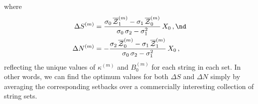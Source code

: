 where
\begin{subequations}%
  \begin{align}
    \Delta S^{(m)} &= \frac{\sigma_0\, \overline{\mathcal{Z}}^{(m)}_1 - \sigma_1\, \overline{\mathcal{Z}}^{(m)}_0}{\sigma_0\, \sigma_2 - \sigma_1^2}\, X_0\, , \nd \\
    \Delta N^{(m)} &= -\frac{\sigma_2\, \overline{\mathcal{Z}}^{(m)}_0 - \sigma_1\, \overline{\mathcal{Z}}^{(m)}_1}{\sigma_0\, \sigma_2 - \sigma_1^2}\, X_0\, ,
  \end{align}
\end{subequations}
reflecting the unique values of $\kappa^{(m)}$ and $B_0^{(m)}$ for each string in each set. In other words, we can find the optimum values for both $\Delta S$ and $\Delta N$ simply by averaging the corresponding setbacks over a commercially interesting collection of string sets. 